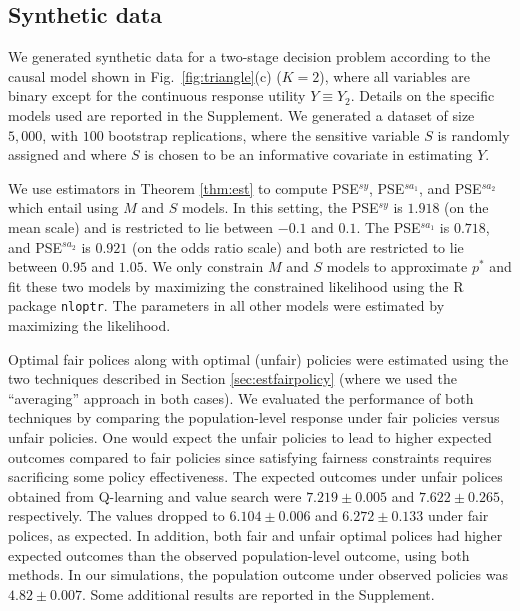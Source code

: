 \documentclass{article}
\begin{document}
\subsection*{Synthetic data}
 
We generated synthetic data for a two-stage decision problem according to the causal model shown in Fig.~\ref{fig:triangle}(c) ($K = 2$), where all variables are binary except for the continuous response utility $Y \equiv Y_2$. Details on the specific models used are reported in the Supplement. We generated a dataset of size $5,000$, with $100$ bootstrap replications, where the sensitive variable $S$ is randomly assigned and where $S$ is chosen to be an informative covariate in estimating $Y$. 

We use estimators in Theorem \ref{thm:est} to compute PSE$^{sy}$, PSE$^{sa_1}$, and PSE$^{sa_2}$ which entail using $M$ and $S$ models.  In this setting, the PSE$^{sy}$ is $1.918$ (on the mean scale) and is restricted to lie between $-0.1$ and $0.1$. The PSE$^{sa_1}$ is $0.718$, and PSE$^{sa_2}$ is $0.921$ (on the odds ratio scale) and both are restricted to lie between $0.95$ and $1.05$. We only constrain $M$ and $S$ models to approximate $p^*$ and fit these two models by maximizing the constrained likelihood using the R package \texttt{nloptr}. The parameters in all other models were estimated by maximizing the likelihood. 

Optimal fair polices along with optimal (unfair) policies were estimated using the two techniques described in Section \ref{sec:estfairpolicy} (where we used the ``averaging'' approach in both cases). We evaluated the performance of both techniques by comparing the population-level response under fair policies versus unfair policies.
%
One would expect the unfair policies to lead to higher expected outcomes compared to fair policies since satisfying fairness constraints requires sacrificing some policy effectiveness. The expected outcomes under unfair polices obtained from Q-learning and value search were  $7.219 \!\pm\! 0.005$ and $7.622 \!\pm\! 0.265$, respectively. The values dropped to $6.104 \!\pm\! 0.006$ and $6.272 \!\pm\! 0.133$ under fair polices, as expected. 
% 
In addition, both fair and unfair optimal polices had higher expected outcomes than the observed population-level outcome, using both methods. In our simulations, the population outcome under observed policies was  $4.82 \!\pm\! 0.007$. Some additional results are reported in the Supplement. 
\end{document}
